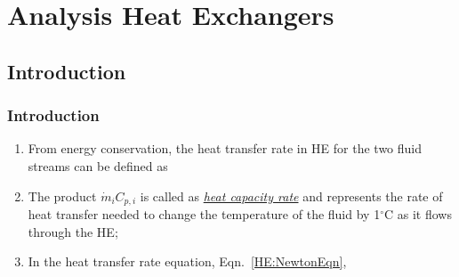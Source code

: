 \documentclass[10pt,compress,unknownkeysallowed]{beamer}
\begin{document}

\section{Analysis Heat Exchangers}

\subsection{Introduction}

\begin{frame}
  \frametitle{Introduction}
     \begin{enumerate}%
          \item<1-> From energy conservation, the heat transfer rate in HE for the two fluid streams can be defined as
          \item<2-> The product $\dot{m}_{i}C_{p,i}$ is called as \underline{\it heat capacity rate} and represents the rate of heat transfer needed to change the temperature of the fluid by 1$^{\circ}$C as it flows through the HE;
          \item<2-> In the heat transfer rate equation, Eqn.~\ref{HE:NewtonEqn},
     \end{enumerate}

\end{frame}
\end{document}
